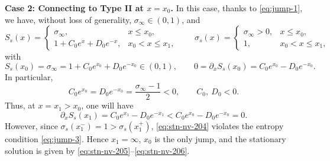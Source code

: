 \documentclass[12pt]{article}
\theoremstyle{definition}
\theoremstyle{remark}
\newcommand{\dx}{\partial_x}
\numberwithin{equation}{section}
\begin{document}
{\noindent\bf Case 2: Connecting to Type II at $ x = x_0 $.} In this case, thanks to \eqref{eq:jump-1}, we have, without loss of generality, $ \sigma_\infty \in (0,1) $, and 
\begin{equation}
    \label{eq:stn-nv-201}
    S_s(x) = \begin{cases}
        \sigma_{\infty}, & x \leq x_0, \\
        1 + C_0 e^x + D_0 e^{-x}, & x_0 < x \leq x_1, 
    \end{cases} \qquad \sigma_s(x) = \begin{cases}
        \sigma_{\infty} > 0, & x \leq x_0, \\
        1, & x_0 < x \leq x_1, 
    \end{cases}
\end{equation}
with 
\begin{equation}
    \label{eq:stn-nv-202}
    S_s(x_0) = \sigma_\infty = 1 + C_0 e^{x_0} + D_0 e^{-x_0} \in (0,1), \qquad 0 = \dx S_s(x_0) = C_0 e^{x_0} - D_0 e^{-x_0}. 
\end{equation}
In particular, 
\begin{equation}
    \label{eq:stn-nv-203}
    C_0e^{x_0} = D_0 e^{-x_0} = \frac{\sigma_\infty - 1}{2} < 0, \qquad C_0, \ D_0 < 0. 
\end{equation}
Thus, at $ x= x_1 > x_0 $, one will have
\begin{equation}
    \label{eq:stn-nv-204}
    \dx S_s(x_1) = C_0 e^{x_1} - D_0 e^{-x_1} < C_0 e^{x_0} - D_0 e^{-x_0} =0. 
\end{equation}
However, since $ \sigma_s(x_1^-) = 1 > \sigma_s(x_1^+) $, \eqref{eq:stn-nv-204} violates the entropy condition \eqref{eq:jump-3}. Hence $ x_1 = \infty $, $ x_0 $ is the only jump, and the stationary solution is given by \eqref{eq:stn-nv-205}--\eqref{eq:stn-nv-206}.
\end{document}
